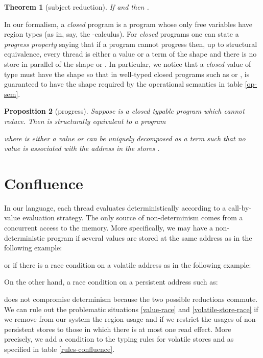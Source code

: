 \documentclass[11pt]{article}
\newtheorem{theorem}{Theorem}
\newtheorem{proposition}[theorem]{Proposition}
\begin{document}
\begin{theorem}[subject reduction]\label{sub-red-thm}
If  and  then
. 
\end{theorem}


In our formalism, a {\em closed} program is a program whose only free variables
have region types (as in, say, the -calculus). 
For {\em closed} programs one can state a {\em progress property}
saying that if a program cannot progress then, up to structural equivalence,
every thread is either a value or a term of the shape  and there
is no store in parallel of the shape  or . In particular,
we notice that a {\em closed} value of type  must have the shape  so
that in well-typed closed programs such as  or
,  is guaranteed to have the shape  
required by the operational semantics in table \ref{op-sem}.

\begin{proposition}[progress]
Suppose  is a closed typable program which cannot reduce. Then
 is structurally equivalent to a program

where  is either a value or can be uniquely decomposed as 
a term  such that no value is associated with the address
 in the stores .
\end{proposition}


\section{Confluence}\label{confluence-sec}
In our language, each thread evaluates deterministically
according to a call-by-value evaluation strategy.
The only source of non-determinism comes from a concurrent
access to the memory. More specifically, we may have a non-deterministic
program if several values are stored at the same address as in the following
example:

or if there is a race condition on a volatile address as in the following
example:

On the other hand, a race condition on a persistent address such as:

does not compromise determinism because the two possible reductions commute.
We can rule out the problematic situations \ref{value-race} and \ref{volatile-store-race} 
if we remove from our system the region usage  and if we restrict
the usages of non-persistent stores to those 
in which there is at most one read effect.
More precisely, we add a condition  to the typing rules
for volatile stores  and  as specified in
table \ref{rules-confluence}.  
\end{document}
